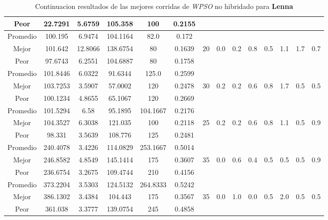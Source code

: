 \begin{table}[h!]
\begin{center}
\begin{tabular}{|c|c|c|c|c|c|c|c|c|c|c|c|c|c|}
            \cline{1-6}
            Peor & 22.7291 & 5.6759  & 105.358 & 100 & 0.2155 &  &  &  &  &  &  &  & \\
        \hline
        \hline
            Promedio  & 100.195 & 6.9474 & 104.1164 & 82.0 & 0.172 &  &  &  &  &  &  &  & \\
            \cline{1-6}
            Mejor & 101.642 & 12.8066  & 138.6754 & 80 & 0.1639 & 20 & 0.0 & 0.2 & 0.8 & 0.5 & 1.1 & 1.7 & 0.7\\
            \cline{1-6}
            Peor & 97.6743 & 6.2551  & 104.6887 & 80 & 0.1758 &  &  &  &  &  &  &  & \\
        \hline
        \hline
            Promedio  & 101.8446 & 6.0322 & 91.6344 & 125.0 & 0.2599 &  &  &  &  &  &  &  & \\
            \cline{1-6}
            Mejor & 103.7253 & 3.5907  & 57.0002 & 120 & 0.2478 & 30 & 0.2 & 0.2 & 0.6 & 0.8 & 1.7 & 0.5 & 0.5\\
            \cline{1-6}
            Peor & 100.1234 & 4.8655  & 65.1067 & 120 & 0.2669 &  &  &  &  &  &  &  & \\
        \hline
        \hline
            Promedio  & 101.5294 & 6.58 & 95.1895 & 104.1667 & 0.2176 &  &  &  &  &  &  &  & \\
            \cline{1-6}
            Mejor & 104.3527 & 6.3038  & 121.035 & 100 & 0.2118 & 25 & 0.2 & 0.2 & 0.6 & 0.8 & 1.1 & 0.5 & 0.9\\
            \cline{1-6}
            Peor & 98.331 & 3.5639  & 108.776 & 125 & 0.2481 &  &  &  &  &  &  &  & \\
        \hline
        \hline
            Promedio  & 240.4078 & 3.4226 & 114.0829 & 253.1667 & 0.5014 &  &  &  &  &  &  &  & \\
            \cline{1-6}
            Mejor & 246.8582 & 4.8549  & 145.1414 & 175 & 0.3607 & 35 & 0.0 & 0.6 & 0.4 & 0.5 & 0.5 & 0.5 & 0.9\\
            \cline{1-6}
            Peor & 236.6754 & 3.2675  & 109.4744 & 210 & 0.4156 &  &  &  &  &  &  &  & \\
        \hline
        \hline
            Promedio  & 373.2204 & 3.5303 & 124.5132 & 264.8333 & 0.5242 &  &  &  &  &  &  &  & \\
            \cline{1-6}
            Mejor & 386.1302 & 3.4384  & 104.443 & 175 & 0.3567 & 35 & 0.0 & 1.0 & 0.0 & 0.5 & 2.0 & 0.5 & 0.5\\
            \cline{1-6}
            Peor & 361.038 & 3.3777  & 139.0754 & 245 & 0.4858 &  &  &  &  &  &  &  & \\
        \hline
        \end{tabular}
        \caption{Continuacion resultados de las mejores corridas de \emph{WPSO} no hibridado para {\bf Lenna}}
        \label{tb:tablewpsoalgimgc}
    \end{center}
\end{table}
